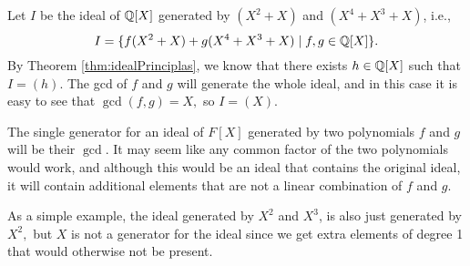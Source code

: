 \begin{example}
  Let $I$ be the ideal of $\mathbb Q[X]$ generated by $(X^2+X)$ and $(X^4+X^3+X)$, i.e., 
  \[I=\{f(X^2+X) + g(X^4+X^3+X) \mid f,g\in \mathbb Q[X]\}.\]
  By Theorem \ref{thm:idealPrinciplas}, we know that there exists $h \in \mathbb Q[X]$ such that $I=(h)$. The gcd of $f$ and $g$ will generate the whole ideal, and in this case it is easy to see that $\gcd(f,g)=X,$ so $I=(X).$ 
\end{example}

\begin{remark}
    The single generator for an ideal of $F[X]$ generated by two polynomials $f$ and $g$ will be their $\gcd$. It may seem like any common factor of the two polynomials would work, and although this would be an ideal that contains the original ideal, it will contain additional elements that are not a linear combination of $f$ and $g.$

    As a simple example, 
    the ideal generated by $X^2$ and $X^3$, is also just generated by $X^2,$ but $X$ is not a generator for the ideal since we get extra elements of degree 1 that would otherwise not be present.
\end{remark}